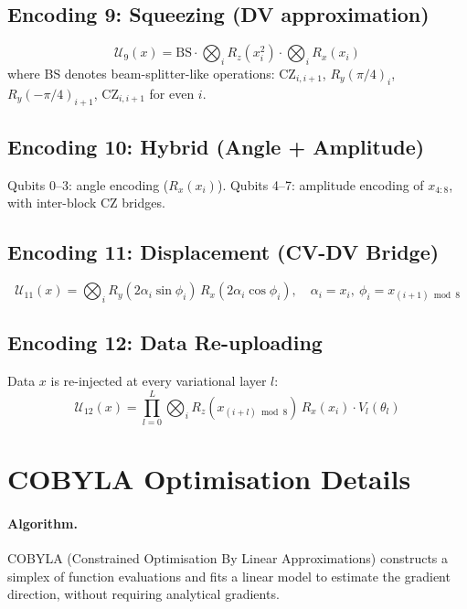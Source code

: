 \documentclass[12pt,a4paper]{article}
\begin{document}
\subsection{Encoding 9: Squeezing (DV approximation)}
\begin{equation}
  \mathcal{U}_9(x) = \text{BS}\cdot\bigotimes_i R_z(x_i^2)\cdot\bigotimes_i R_x(x_i)
\end{equation}
where BS denotes beam-splitter-like operations:
CZ$_{i,i+1}$, $R_y(\pi/4)_i$, $R_y(-\pi/4)_{i+1}$, CZ$_{i,i+1}$
for even $i$.

\subsection{Encoding 10: Hybrid (Angle + Amplitude)}
Qubits 0–3: angle encoding ($R_x(x_i)$).
Qubits 4–7: amplitude encoding of $x_{4:8}$, with inter-block CZ bridges.

\subsection{Encoding 11: Displacement (CV-DV Bridge)}
\begin{equation}
  \mathcal{U}_{11}(x) = \bigotimes_i
  R_y(2\alpha_i\sin\phi_i)\,R_x(2\alpha_i\cos\phi_i),
  \quad \alpha_i=x_i,\ \phi_i=x_{(i+1)\bmod 8}
\end{equation}

\subsection{Encoding 12: Data Re-uploading}
Data $x$ is re-injected at every variational layer $l$:
\begin{equation}
  \mathcal{U}_{12}(x) = \prod_{l=0}^{L}
  \bigotimes_i R_z(x_{(i+l)\bmod 8})\,R_x(x_i)\cdot V_l(\theta_l)
\end{equation}

\section{COBYLA Optimisation Details}
\label{sec:cobyla}

\paragraph{Algorithm.} COBYLA (Constrained Optimisation By Linear Approximations)
constructs a simplex of function evaluations and fits a linear model to
estimate the gradient direction, without requiring analytical gradients.
\end{document}
